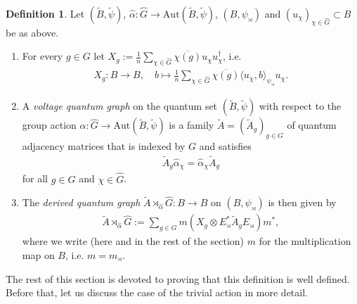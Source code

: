\documentclass{amsart}
\theoremstyle{definition}
\newtheorem{definition}[thm]{Definition}
\theoremstyle{definition}
\begin{document}
\begin{definition}
    \label{der::def:derived_quantum_graph}
    Let $(\tilde{B}, \tilde{\psi})$, $\hat{\alpha}: \hat{G} \to \mathrm{Aut}(\tilde{B}, \tilde{\psi})$, $(B, \psi_\rtimes)$ and $(u_\chi)_{\chi \in \hat{G}} \subset B$ be as above.
    \begin{enumerate}[label=(\alph*)]
        \item For every $g \in G$ let $X_g := \frac{1}{n} \sum_{\chi \in \hat{G}}\overline{\chi(g)} u_\chi u_\chi^\dagger$, i.e.
        \begin{align*}
            X_g : B \to B, \quad b \mapsto \frac{1}{n} \sum_{\chi \in \hat{G}} \overline{\chi(g)} \langle u_\chi, b \rangle_{\psi_\rtimes} u_\chi.
        \end{align*}
        \item A \emph{voltage quantum graph} on the quantum set $(\tilde{B}, \tilde{\psi})$ with respect to the group action $\hat{\alpha}: \hat{G} \to \mathrm{Aut}(\tilde{B}, \tilde{\psi})$ is a family $\tilde{A} = (\tilde{A}_g)_{g \in G}$ of quantum adjacency matrices that is indexed by $G$ and satisfies
        \begin{align}
            \label{der::eq:qvoltage_graph_invariance_under_group_action}
            \tilde{A}_g \hat{\alpha}_\chi = \hat{\alpha}_\chi \tilde{A}_g
        \end{align}
        for all $g \in G$ and $\chi \in \hat{G}$. 
        \item The \emph{derived quantum graph} $\tilde{A} \rtimes_{\hat{\alpha}} \hat{G}: B \to B$ on $(B, \psi_\rtimes)$ is then given by
        \begin{align*}
            \tilde{A} \rtimes_{\hat{\alpha}} \hat{G} := \sum_{g \in G} m(X_g \otimes E_\rtimes^\ast \tilde{A}_g E_\rtimes) m^\ast,
        \end{align*}
        where we write (here and in the rest of the section) $m$ for the multiplication map on $B$, i.e. $m = m_\rtimes$.
    \end{enumerate}
\end{definition}

The rest of this section is devoted to proving that this definition is well defined. Before that, let us discuss the case of the trivial action in more detail.
\end{document}
